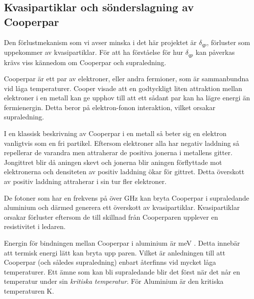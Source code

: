 \documentclass[main.tex]{subfiles}
\begin{document}
\subsection{Kvasipartiklar och sönderslagning av Cooperpar}
\label{sec:cooper}
Den förlustmekanism som vi avser minska i det här projektet är $\delta_{qp}$, förluster som uppekommer av kvasipartiklar. För att ha förståelse för hur $\delta_{qp}$ kan påverkas krävs viss kännedom om Cooperpar och supraledning.

Cooperpar är ett par av elektroner, eller andra fermioner, som är sammanbundna vid låga temperaturer. Cooper visade att en godtyckligt liten attraktion mellan elektroner i en metall kan ge upphov till att ett sådant par kan ha lägre energi än fermienergin. Detta beror på elektron-fonon interaktion, vilket orsakar supraledning.

I en klassisk beskrivning av Cooperpar i en metall så beter sig en elektron vanligtvis som en fri partikel. Eftersom elektroner alla har negativ laddning så repellerar de varandra men attraherar de positiva jonerna i metallens gitter. Jongittret blir då aningen skevt och jonerna blir aningen förflyttade mot elektronerna och densiteten av positiv laddning ökar för gittret. Detta överskott av positiv laddning attraherar i sin tur fler elektroner. 

De fotoner som har en frekvens på över \unit[88]{GHz} kan bryta Cooperpar i supraledande aluminium och därmed generera ett överskott av kvasipartiklar. Kvasipartiklar orsakar förluster eftersom de till skillnad från Cooperparen upplever en resistivitet i ledaren.

Energin för bindningen mellan Cooperpar i aluminium är \unit[0,39]{meV} \cite{placeholder}. Detta innebär att termisk energi lätt kan bryta upp paren. Vilket är anledningen till att Cooperpar (och således supraledning) enbart återfinns vid mycket låga temperaturer. Ett ämne som kan bli supraledande blir det först när det når en temperatur under sin \emph{kritiska temperatur}. För Aluminium är den kritiska temperaturen \unit[1,2]{K}.



\end{document}
